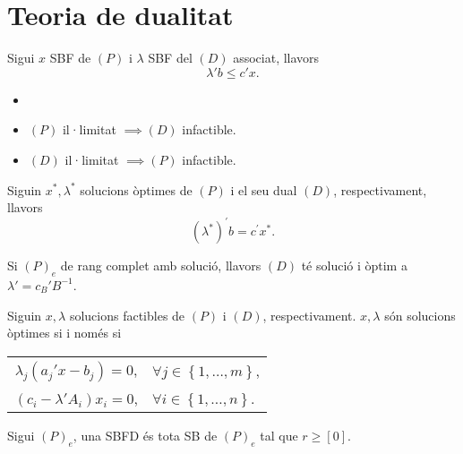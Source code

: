 \section{Teoria de dualitat}

\begin{teo}
    Sigui $x$ SBF de $\left(P\right)$ i $\lambda$ SBF del $\left(D\right)$ associat, llavors
    \[ \lambda' b\leq c'x. \]
\end{teo}
\begin{col}
    \begin{itemize}
        \item[]
        \item $\left(P\right)$ il·limitat $\implies \left(D\right)$ infactible.
        \item $\left(D\right)$ il·limitat $\implies \left(P\right)$ infactible.
    \end{itemize}
\end{col}
\begin{teo}
    Siguin $x^*, \lambda^*$ solucions òptimes de $\left(P\right)$ i el seu dual $\left(D\right)$, respectivament, llavors
    \[ \left(\lambda^*\right)^\prime b = c^\prime x^*.\]
\end{teo}
\begin{col}
    Si $\left(P\right)_e$ de rang complet amb solució, llavors $\left(D\right)$ té solució i òptim a $\lambda' = c_B'B^{-1}$.
\end{col}
\begin{teo}
    Siguin $x, \lambda$ solucions factibles de $\left(P\right)$ i $\left(D\right)$, respectivament. $x, \lambda$ són solucions òptimes si i només si
    \begin{center}
        \begin{tabular}{cl}
            $\lambda_j \left(a_j'x - b_j\right) = 0$, & $\forall j \in \left\{1, \dots, m\right\}$, \\
            $\left(c_i - \lambda'A_i\right) x_i = 0$, & $\forall i \in \left\{1, \dots, n\right\}$.
        \end{tabular}
    \end{center}
\end{teo}
\begin{defi}
    Sigui $\left(P\right)_e$, una SBFD és tota SB de $\left(P\right)_e$ tal que $r \geq \left[0\right]$.
\end{defi}
